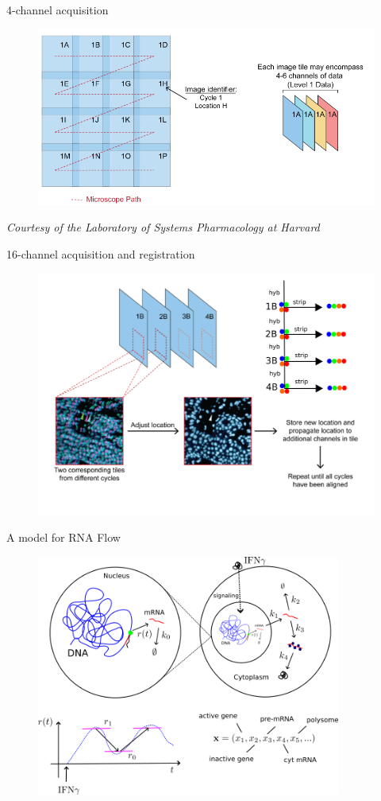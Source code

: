 \documentclass[aspectratio=1610]{beamer}					%
\begin{document}
\begin{frame}{4-channel acquisition}
\begin{figure}
\includegraphics[width=12cm]{tiling-1.png}
\end{figure}
\textit{Courtesy of the Laboratory of Systems Pharmacology at Harvard}
\end{frame}


\begin{frame}{16-channel acquisition and registration}
\begin{figure}
\includegraphics[width=12cm]{tiling-3.png}
\end{figure}
\end{frame}

\begin{frame}{A model for RNA Flow}
\begin{figure}
\includegraphics[width=10cm]{RNAFlow.png}
\end{figure}
\end{frame}
\end{document}
